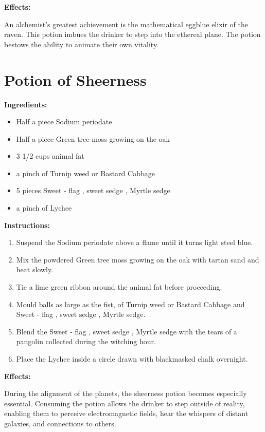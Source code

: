 \documentclass{article}
\begin{document}
\textbf{Effects:}

An alchemist's greatest achievement is the mathematical eggblue elixir of the raven. This potion imbues the drinker to step into the ethereal plane. The potion bestows the ability to animate their own vitality.

\newpage
\section*{Potion of Sheerness}

\textbf{Ingredients:}

\begin{itemize}
  \item Half a piece Sodium periodate
  \item Half a piece Green tree moss growing on the oak
  \item 3 1/2 cups animal fat
  \item a pinch of Turnip weed or Bastard Cabbage
  \item 5 pieces Sweet - flag , sweet sedge , Myrtle sedge
  \item a pinch of Lychee
\end{itemize}

\textbf{Instructions:}

\begin{enumerate}
  \item Suspend the Sodium periodate above a flame until it turns light steel blue.
  \item Mix the powdered Green tree moss growing on the oak with tartan sand and heat slowly.
  \item Tie a lime green ribbon around the animal fat before proceeding.
  \item Mould balls as large as the fist, of Turnip weed or Bastard Cabbage and Sweet - flag , sweet sedge , Myrtle sedge.
  \item Blend the Sweet - flag , sweet sedge , Myrtle sedge with the tears of a pangolin collected during the witching hour.
  \item Place the Lychee inside a circle drawn with blackmasked chalk overnight.
\end{enumerate}

\textbf{Effects:}

During the alignment of the planets, the sheerness potion becomes especially essential. Consuming the potion allows the drinker to step outside of reality, enabling them to perceive electromagnetic fields, hear the whispers of distant galaxies, and connections to others.
\end{document}
